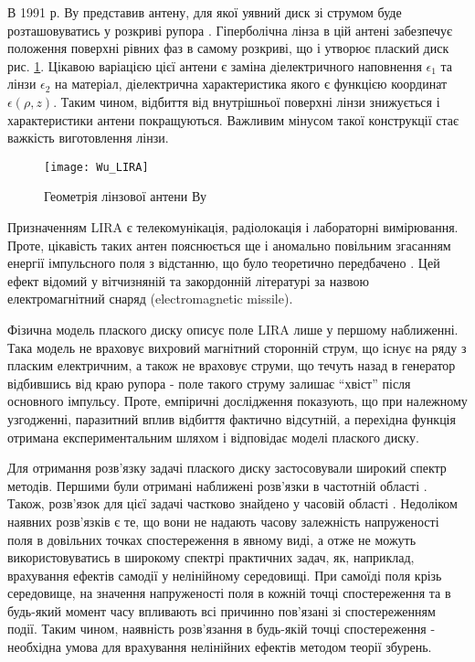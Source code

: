 В 1991 р. Ву представив антену, для якої уявний диск зі струмом буде 
розташовуватись у розкриві рупора \cite{imp:Wu1991}. Гіперболічна лінза в 
цій антені забезпечує положення поверхні рівних фаз в самому розкриві, що і 
утворює плаский диск рис. \ref{fig:lira_wu}. Цікавою варіацією цієї антени є 
заміна діелектричного наповнення $ \epsilon_1 $ та лінзи $ \epsilon_2 $ на 
матеріал, діелектрична характеристика якого є функцією координат 
$ \epsilon(\rho, z) $. Таким чином, відбиття від внутрішньої поверхні лінзи 
знижується і характеристики антени покращуються. Важливим мінусом такої 
конструкції стає важкість виготовлення лінзи.

\begin{figure}[htbp] \begin{center}
\texttt{[image: Wu\_LIRA]}
\caption{Геометрія лінзової антени Ву} \label{fig:lira_wu}
\end{center} \end{figure}

Призначенням LIRA є телекомунікація, радіолокація і лабораторні вимірювання. 
Проте, цікавість таких антен пояснюється ще і аномально повільним згасанням 
енергії імпульсного поля з відстанню, що було теоретично передбачено 
\cite{imp:Wu1987}. Цей ефект відомий у вітчизняній та закордонній літературі 
за назвою електромагнітний снаряд (electromagnetic missile).

Фізична модель плаского диску описує поле LIRA лише у першому наближенні.
Така модель не враховує вихровий магнітний сторонній струм, що існує на ряду 
з пласким електричним, а також не враховує струми, що течуть назад в 
генератор відбившись від краю рупора - поле такого струму залишає ``хвіст'' 
після основного імпульсу. Проте, емпіричні дослідження 
\cite{imp:BaumSSN0396,imp:BaumSSN0401} показують, що при належному 
узгодженні, паразитний вплив відбиття фактично відсутній, а перехідна 
функція отримана експериментальним шляхом і відповідає моделі плаского диску.

Для отримання розв'язку задачі плаского диску застосовували широкий спектр 
методів. Першими були отримані наближені розв'язки в частотній області 
\cite{imp:Wu1985,imp:Sodin1992-10}. Також, розв'язок для цієї задачі частково
знайдено у часовій області \cite{imp:Dumin1996}. Недоліком наявних розв'язків 
є те, що вони не надають часову залежність напруженості поля в довільних точках 
спостереження в явному виді, а отже не можуть використовуватись в широкому 
спектрі практичних задач, як, наприклад, врахування ефектів самодії у 
нелінійному середовищі. При самоїді поля крізь середовище, на значення 
напруженості поля в кожній точці спостереження та в будь-який момент часу 
впливають всі причинно пов'язані зі спостереженням події. Таким чином, 
наявність розв'язання в будь-якій точці спостереження - необхідна умова для 
врахування нелінійних ефектів методом теорії збурень.

